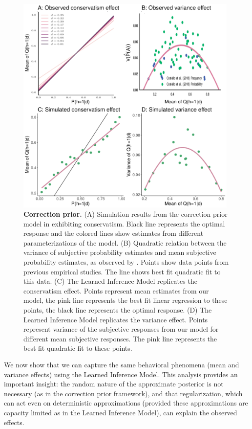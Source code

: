 \begin{figure}
\centering
    \includegraphics[width=0.98\textwidth]{figures/correctionprior2.pdf}
  \caption{\textbf{Correction prior.} (A) Simulation results from the correction prior model in \cite{zhu_sanborn_chater_2018} exhibiting conservatism. Black line represents the optimal response and the colored lines show estimates from different parameterizations of the model. (B) Quadratic relation between the variance of subjective probability estimates and mean subjective probability estimates, as observed by \cite{zhu_sanborn_chater_2018}. Points show data points from previous empirical studies. The line shows best fit quadratic fit to this data. (C) The Learned Inference Model replicates the conservatism effect. Points represent mean estimates from our model, the pink line represents the best fit linear regression to these points, the black line represents the optimal response. (D) The Learned Inference Model replicates the variance effect. Points represent variance of the subjective responses from our model for different mean subjective responses. The pink line represents the best fit quadratic fit to these points.} 
  \label{fig:CP}
\end{figure}

We now show that we can capture the same behavioral phenomena (mean and variance effects) using the Learned Inference Model. This analysis provides an important insight: the random nature of the approximate posterior is not necessary (as in the correction prior framework), and that regularization, which can act even on deterministic approximations (provided these approximations are capacity limited as in the Learned Inference Model), can explain the observed effects.

